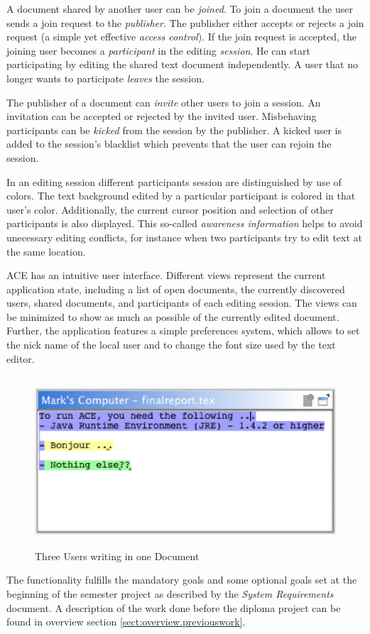 A document shared by another user can be \emph{joined}. To join a document the user sends a join request to the \emph{publisher}. The publisher either accepts or rejects a join request (a simple yet effective \emph{access control}). If the join request is accepted, the joining user becomes a \emph{participant} in the editing \emph{session}. He can start participating by editing the shared text document independently. A user that no longer wants to participate \emph{leaves} the session.

The publisher of a document can \emph{invite} other users to join a session. An invitation can be accepted or rejected by the invited user. Misbehaving participants can be \emph{kicked} from the session by the publisher. A kicked user is added to the session's blacklist which prevents that the user can rejoin the session.

In an editing session different participants session are distinguished by use of colors. The text background edited by a particular participant is colored in that user's color. Additionally, the current cursor position and selection of other participants is also displayed. This so-called \emph{awareness information} helps to avoid unecessary editing conflicts, for instance when two participants try to edit text at the same location.

ACE has an intuitive user interface. Different views represent the current application state, including a list of open documents, the currently discovered users, shared documents, and participants of each editing session. The views can be minimized to show as much as possible of the currently edited document. Further, the application features a simple preferences system, which allows to set the nick name of the local user and to change the font size used by the text editor.

\begin{figure}[H]
\begin{center}
  \includegraphics[height=2.5in, width=5.12in]{../images/usermanual/editor_collab_3users.eps}
\caption{Three Users writing in one Document}
\end{center}
\end{figure}

The functionality fulfills the mandatory goals and some optional goals set at the beginning of the semester project as described by the \emph{System Requirements} document. A description of the work done before the diploma project can be found in overview section \ref{sect:overview.previouswork}.
